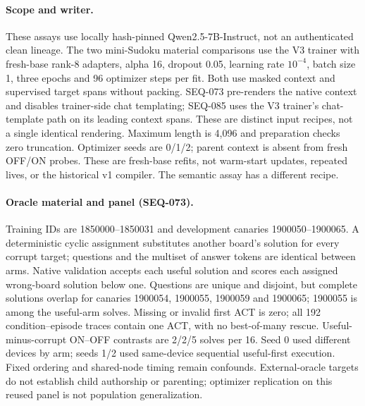 \documentclass{article}
\begin{document}
\paragraph{Scope and writer.} These assays use locally hash-pinned Qwen2.5-7B-Instruct, not an authenticated clean lineage. The two mini-Sudoku material comparisons use the V3 trainer with fresh-base rank-8 adapters, alpha 16, dropout 0.05, learning rate $10^{-4}$, batch size 1, three epochs and 96 optimizer steps per fit. Both use masked context and supervised target spans without packing. SEQ-073 pre-renders the native context and disables trainer-side chat templating; SEQ-085 uses the V3 trainer's chat-template path on its leading context spans. These are distinct input recipes, not a single identical rendering. Maximum length is 4,096 and preparation checks zero truncation. Optimizer seeds are 0/1/2; parent context is absent from fresh OFF/ON probes. These are fresh-base refits, not warm-start updates, repeated lives, or the historical v1 compiler. The semantic assay has a different recipe.

\paragraph{Oracle material and panel (SEQ-073).} Training IDs are 1850000--1850031 and development canaries 1900050--1900065. A deterministic cyclic assignment substitutes another board's solution for every corrupt target; questions and the multiset of answer tokens are identical between arms. Native validation accepts each useful solution and scores each assigned wrong-board solution below one. Questions are unique and disjoint, but complete solutions overlap for canaries 1900054, 1900055, 1900059 and 1900065; 1900055 is among the useful-arm solves. Missing or invalid first ACT is zero; all 192 condition--episode traces contain one ACT, with no best-of-many rescue. Useful-minus-corrupt ON--OFF contrasts are 2/2/5 solves per 16. Seed 0 used different devices by arm; seeds 1/2 used same-device sequential useful-first execution. Fixed ordering and shared-node timing remain confounds. External-oracle targets do not establish child authorship or parenting; optimizer replication on this reused panel is not population generalization.
\end{document}
